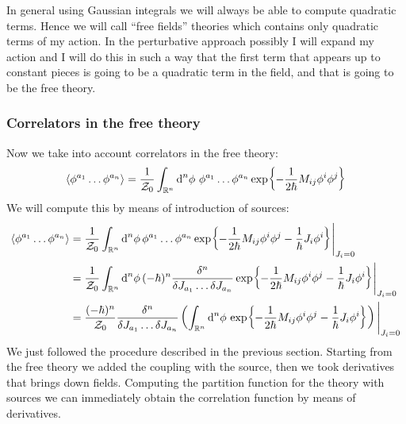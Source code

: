 \documentclass[../main/main.tex]{subfiles}
\begin{document}
In general using Gaussian integrals we will always be able to compute quadratic terms. Hence we will call ``free fields'' theories which contains only quadratic terms of my action. In the perturbative approach possibly I will expand my action and I will do this in such a way that the first term that appears up to constant pieces is going to be a quadratic term in the field, and that is going to be the free theory. 

\subsubsection{Correlators in the free theory}

Now we take into account correlators in the free theory:
\[\langle\phi^{a_1}\dots\phi^{a_n}\rangle=\frac1{\mathcal Z_0}\int_{\mathbb{R}^n}\textup{d}^n\phi\,\,\phi^{a_1}\dots\phi^{a_n}\exp{-\frac1{2\hbar}M_{ij}\phi^i\phi^j}\]
We will compute this by means of introduction of sources:
\begin{align*}
\langle\phi^{a_1}\dots\phi^{a_n}\rangle
&=\frac1{\mathcal Z_0}\int_{\mathbb{R}^n}\textup{d}^n\phi\,\phi^{a_1}\dots\phi^{a_n}\exp{-\frac1{2\hbar}M_{ij}\phi^i\phi^j-\frac{1}\hbar J_i\phi^i}\Bigg\vert_{J_i=0}\\
&=\frac1{\mathcal Z_0}\int_{\mathbb{R}^n}\textup{d}^n\phi\,(-\hbar)^n\frac{\delta^n}{\delta J_{a_1}\dots \delta J_{a_n}}\exp{-\frac1{2\hbar}M_{ij}\phi^i\phi^j-\frac{1}\hbar J_i\phi^i}\Bigg\vert_{J_i=0}\\
&=\frac{(-\hbar)^n}{\mathcal Z_0}\frac{\delta^n}{\delta J_{a_1}\dots \delta J_{a_n}}\left(\int_{\mathbb{R}^n}\textup{d}^n\phi\,\exp{-\frac1{2\hbar}M_{ij}\phi^i\phi^j-\frac{1}\hbar J_i\phi^i}\right)\Bigg\vert_{J_i=0}
\end{align*}
We just followed the procedure described in the previous section. Starting from the free theory we added the coupling with the source, then we took derivatives that brings down fields. Computing the partition function for the theory with sources we can immediately obtain the correlation function by means of derivatives. 
\end{document}
